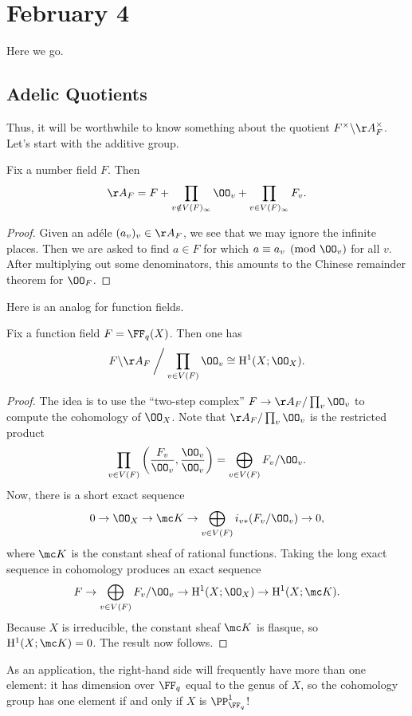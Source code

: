 \documentclass[../notes.tex]{subfiles}
\begin{document}
\section{February 4}
Here we go.

\subsection{Adelic Quotients}
Thus, it will be worthwhile to know something about the quotient $F^\times\backslash\AA_F^\times$. Let's start with the additive group.
\begin{theorem}[approximation] \label{thm:approximate-ga}
	Fix a number field $F$. Then
	\[\AA_F=F+\prod_{v\notin V(F)_\infty}\OO_v+\prod_{v\in V(F)_\infty}F_v.\]
\end{theorem}
\begin{proof}
	Given an ad\'ele $(a_v)_v\in\AA_F$, we see that we may ignore the infinite places. Then we are asked to find $a\in F$ for which $a\equiv a_v\pmod{\OO_v}$ for all $v$. After multiplying out some denominators, this amounts to the Chinese remainder theorem for $\OO_F$.
\end{proof}
Here is an analog for function fields.
\begin{proposition}
	Fix a function field $F=\FF_q(X)$. Then one has
	\[F\backslash\AA_F\mathbin{\bigg/}\prod_{v\in V(F)}\OO_v\cong\mathrm H^1(X;\OO_X).\]
\end{proposition}
\begin{proof}
	The idea is to use the ``two-step complex'' $F\to\AA_F/\prod_v\OO_v$ to compute the cohomology of $\OO_X$. Note that $\AA_F/\prod_v\OO_v$ is the restricted product
	\[\prod_{v\in V(F)}\left(\frac{F_v}{\OO_v},\frac{\OO_v}{\OO_v}\right)=\bigoplus_{v\in V(F)}F_v/\OO_v.\]
	Now, there is a short exact sequence
	\[0\to\OO_X\to\mc K\to\bigoplus_{v\in V(F)}i_{v*}(F_v/\OO_v)\to0,\]
	where $\mc K$ is the constant sheaf of rational functions. Taking the long exact sequence in cohomology produces an exact sequence
	\[F\to\bigoplus_{v\in V(F)}F_v/\OO_v\to\mathrm H^1(X;\OO_X)\to\mathrm H^1(X;\mc K).\]
	Because $X$ is irreducible, the constant sheaf $\mc K$ is flasque, so $\mathrm H^1(X;\mc K)=0$. The result now follows.
\end{proof}
\begin{remark}
	As an application, the right-hand side will frequently have more than one element: it has dimension over $\FF_q$ equal to the genus of $X$, so the cohomology group has one element if and only if $X$ is $\PP^1_{\FF_q}$!
\end{remark}
\end{document}
